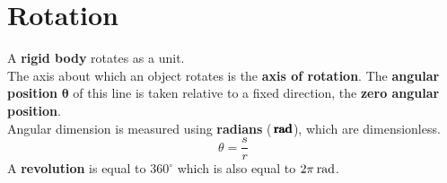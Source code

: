 \documentclass[../AP_Physics_C.tex]{subfiles}
\begin{document}
	\section{Rotation}
		A \textbf{rigid body} rotates as a unit. \\
		The axis about which an object rotates is the \textbf{axis of rotation}. The \textbf{angular position} $\pmb{\theta}$ of this line is taken relative to a fixed direction, the \textbf{zero angular position}. \\
		Angular dimension is measured using \textbf{radians} ($\pmb{\hspace{0.7mm}\mathrm{rad}}$), which are dimensionless.
		\[\theta = \frac{s}{r}\]
		A \textbf{revolution} is equal to $360^\circ$ which is also equal to $2\pi\hspace{0.7mm}\mathrm{rad}$.
\end{document}
